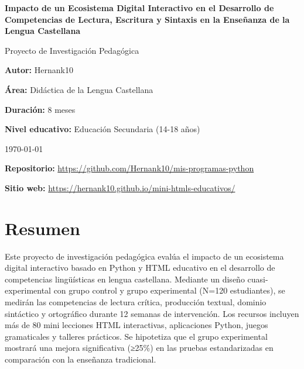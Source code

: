 \documentclass[12pt,spanish]{article}
\newcommand{\autor}{Hernank10}
\begin{document}
\begin{titlepage}
    \centering
    \vspace*{2cm}
    {\Huge \textbf{Impacto de un Ecosistema Digital Interactivo en el Desarrollo de Competencias de Lectura, Escritura y Sintaxis en la Enseñanza de la Lengua Castellana} \par}
    \vspace{1cm}
    {\Large Proyecto de Investigación Pedagógica \par}
    \vspace{1.5cm}
    {\large \textbf{Autor:} \autor \par}
    \vspace{0.5cm}
    {\large \textbf{Área:} Didáctica de la Lengua Castellana \par}
    \vspace{0.5cm}
    {\large \textbf{Duración:} 8 meses \par}
    \vspace{0.5cm}
    {\large \textbf{Nivel educativo:} Educación Secundaria (14-18 años) \par}
    \vspace{2cm}
    {\large \today \par}
    \vfill
    {\large \textbf{Repositorio:} \url{https://github.com/Hernank10/mis-programas-python} \par}
    \vspace{0.3cm}
    {\large \textbf{Sitio web:} \url{https://hernank10.github.io/mini-htmls-educativos/} \par}
\end{titlepage}

\section*{Resumen}

Este proyecto de investigación pedagógica evalúa el impacto de un ecosistema digital interactivo basado en Python y HTML educativo en el desarrollo de competencias lingüísticas en lengua castellana. Mediante un diseño cuasi-experimental con grupo control y grupo experimental (N=120 estudiantes), se medirán las competencias de lectura crítica, producción textual, dominio sintáctico y ortográfico durante 12 semanas de intervención. Los recursos incluyen más de 80 mini lecciones HTML interactivas, aplicaciones Python, juegos gramaticales y talleres prácticos. Se hipotetiza que el grupo experimental mostrará una mejora significativa (≥25\%) en las pruebas estandarizadas en comparación con la enseñanza tradicional.
\end{document}
